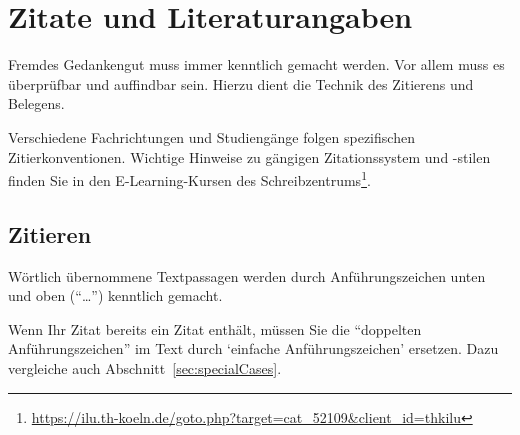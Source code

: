 \chapter{Zitate und Literaturangaben}
\label{chap:literature}
%
Fremdes Gedankengut muss immer kenntlich gemacht werden. Vor allem muss es überprüfbar und auffindbar sein. Hierzu dient die Technik des Zitierens und Belegens.
\par
Verschiedene Fachrichtungen und Studiengänge folgen spezifischen Zitierkonventionen. Wichtige Hinweise zu gängigen Zitationssystem und -stilen finden Sie in den E-Learning-Kursen des Schreibzentrums\footnote{\href{https://ilu.th-koeln.de/goto.php?target=cat\_52109\&client\_id=thkilu}{https://ilu.th-koeln.de/goto.php?target=cat\_52109\&client\_id=thkilu}}.
%
\section{Zitieren}
\par
Wörtlich übernommene Textpassagen werden durch Anführungszeichen unten und oben (\enquote{\ldots}) kenntlich gemacht.
\par
Wenn Ihr Zitat bereits ein Zitat enthält, müssen Sie die \enquote{doppelten Anführungszeichen} im Text durch \enquote*{einfache Anführungszeichen} ersetzen. Dazu vergleiche auch Abschnitt~\ref{sec:specialCases}.
%
